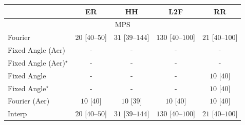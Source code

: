 \begin{tabular}{l|cccc|}
\toprule
            & ER & HH & L2F & RR \\
\midrule
\multicolumn{5}{c}{\rule{0pt}{8pt}MPS} \\
\midrule
Fourier & {\cellcolor[HTML]{F4FBF1}} \color[HTML]{000000} $20$ [$40$--$50$] & {\cellcolor[HTML]{F1FAEE}} \color[HTML]{000000} $31$ [$39$--$144$] & {\cellcolor[HTML]{D7EFD1}} \color[HTML]{000000} $130$ [$40$--$100$] & {\cellcolor[HTML]{F3FAF0}} \color[HTML]{000000} $21$ [$40$--$100$] \\
Fixed Angle (Aer) & {\cellcolor[HTML]{000000}} \color[HTML]{F1F1F1} {\cellcolor{white}} \color{black} - & {\cellcolor[HTML]{000000}} \color[HTML]{F1F1F1} {\cellcolor{white}} \color{black} - & {\cellcolor[HTML]{000000}} \color[HTML]{F1F1F1} {\cellcolor{white}} \color{black} - & {\cellcolor[HTML]{000000}} \color[HTML]{F1F1F1} {\cellcolor{white}} \color{black} - \\
Fixed Angle (Aer)$^\star$ & {\cellcolor[HTML]{000000}} \color[HTML]{F1F1F1} {\cellcolor{white}} \color{black} - & {\cellcolor[HTML]{000000}} \color[HTML]{F1F1F1} {\cellcolor{white}} \color{black} - & {\cellcolor[HTML]{000000}} \color[HTML]{F1F1F1} {\cellcolor{white}} \color{black} - & {\cellcolor[HTML]{000000}} \color[HTML]{F1F1F1} {\cellcolor{white}} \color{black} - \\
Fixed Angle & {\cellcolor[HTML]{000000}} \color[HTML]{F1F1F1} {\cellcolor{white}} \color{black} - & {\cellcolor[HTML]{000000}} \color[HTML]{F1F1F1} {\cellcolor{white}} \color{black} - & {\cellcolor[HTML]{000000}} \color[HTML]{F1F1F1} {\cellcolor{white}} \color{black} - & {\cellcolor[HTML]{F5FBF3}} \color[HTML]{000000} $10$ [$40$] \\
Fixed Angle$^\star$ & {\cellcolor[HTML]{000000}} \color[HTML]{F1F1F1} {\cellcolor{white}} \color{black} - & {\cellcolor[HTML]{000000}} \color[HTML]{F1F1F1} {\cellcolor{white}} \color{black} - & {\cellcolor[HTML]{000000}} \color[HTML]{F1F1F1} {\cellcolor{white}} \color{black} - & {\cellcolor[HTML]{F5FBF3}} \color[HTML]{000000} $10$ [$40$] \\
Fourier (Aer) & {\cellcolor[HTML]{F5FBF3}} \color[HTML]{000000} $10$ [$40$] & {\cellcolor[HTML]{F5FBF3}} \color[HTML]{000000} $10$ [$39$] & {\cellcolor[HTML]{F5FBF3}} \color[HTML]{000000} $10$ [$40$] & {\cellcolor[HTML]{F5FBF3}} \color[HTML]{000000} $10$ [$40$] \\
Interp & {\cellcolor[HTML]{F4FBF1}} \color[HTML]{000000} $20$ [$40$--$50$] & {\cellcolor[HTML]{F1FAEE}} \color[HTML]{000000} $31$ [$39$--$144$] & {\cellcolor[HTML]{D7EFD1}} \color[HTML]{000000} $130$ [$40$--$100$] & {\cellcolor[HTML]{F3FAF0}} \color[HTML]{000000} $21$ [$40$--$100$] \\

\end{tabular}
